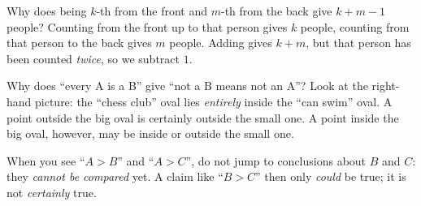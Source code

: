 \begin{proofbox}
Why does being $k$-th from the front and $m$-th from the back give $k+m-1$ people? Counting from the front up to that person gives
$k$ people, counting from that person to the back gives $m$ people. Adding gives $k+m$, but that person has been counted \emph{twice},
so we subtract $1$.

Why does ``every A is a B'' give ``not a B means not an A''? Look at the right-hand picture: the ``chess club'' oval lies
\emph{entirely} inside the ``can swim'' oval. A point outside the big oval is certainly outside the small one. A point inside the big
oval, however, may be inside or outside the small one.
\end{proofbox}
\begin{warnbox}
When you see ``$A > B$'' and ``$A > C$'', do not jump to conclusions about $B$ and $C$: they \emph{cannot be compared} yet. A claim
like ``$B > C$'' then only \emph{could} be true; it is not \emph{certainly} true.
\end{warnbox}


